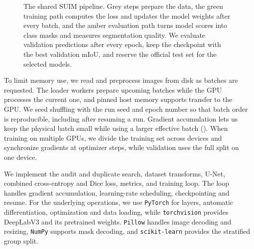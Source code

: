 \begin{figure}[htbp]
{}
\caption{The shared SUIM pipeline. Grey steps prepare the data, the green
training path computes the loss and updates the model weights after every
batch, and the amber evaluation path turns model scores into class masks and
measures segmentation quality. We evaluate validation predictions after every
epoch, keep the checkpoint with the best validation mIoU, and reserve the
official test set for the selected models.}
\label{fig:pipeline}
\end{figure}

To limit memory use, we read and preprocess images from disk as batches are
requested. The \unetWorkers{} loader workers prepare upcoming batches while
the GPU processes the current one, and pinned host memory supports transfer to
the GPU. We seed shuffling with the run seed and epoch number so that batch
order is reproducible, including after resuming a run. Gradient accumulation
lets us keep the physical batch small while using a larger effective batch
(). When training on multiple GPUs, we divide the training
set across devices and synchronize gradients at optimizer steps, while
validation uses the full split on one device.

We implement the audit and duplicate search, dataset transforms, U-Net,
combined cross-entropy and Dice loss, metrics, and training loop. The loop
handles gradient accumulation, learning-rate scheduling, checkpointing and
resume. For the underlying operations, we use \texttt{PyTorch} for layers,
automatic differentiation, optimization and data loading, while \texttt{torchvision}
provides DeepLabV3 and its pretrained weights. \texttt{Pillow} handles image decoding
and resizing, \texttt{NumPy} supports mask decoding, and \texttt{scikit-learn} provides the
stratified group split.

